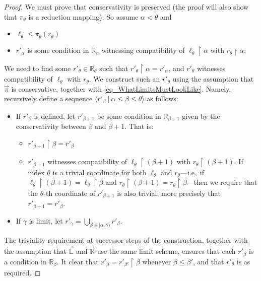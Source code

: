 \documentclass{amsart}
\begin{document}
\begin{proof}
We must prove that conservativity is preserved (the proof will also show that $\pi_\theta$ is a reduction mapping).  So assume $\alpha < \theta$ and
\begin{itemize}
  \item $\ell_\theta \le \pi_\theta(r_\theta)$
  \item $r'_\alpha$ is some condition in $\mathbb{R}_\alpha$ witnessing compatibility of $\ell_\theta \restriction \alpha$ with $r_\theta \restriction \alpha$;  
 \end{itemize}
We need to find some $r'_\theta \in \mathbb{R}_\theta$ such that $r'_\theta \restriction \alpha = r'_\alpha$, and $r'_\theta$ witnesses compatibility of $\ell_\theta$ with $r_\theta$.  We construct such an $r'_\theta$ using the assumption that $\vec{\pi}$ is conservative, together with \eqref{eq_WhatLimitsMustLookLike}.  Namely, recursively define a sequence $\langle r'_\beta \ | \ \alpha \le \beta \le \theta \rangle$ as follows:
\begin{itemize}
 \item If $r'_\beta$ is defined, let $r'_{\beta+1}$ be some condition in $\mathbb{R}_{\beta+1}$ given by the conservativity between $\beta$ and $\beta + 1$.  That is:
 \begin{itemize}
  \item  $r'_{\beta+1} \restriction \beta = r'_\beta$ 
  \item $r'_{\beta+1}$ witnesses compatibility of $\ell_\theta \restriction (\beta+1)$ with $r_\theta \restriction (\beta+1)$.  If index $\theta$ is a trivial coordinate for both $\ell_\theta$ and $r_\theta$---i.e.\ if  $\ell_\theta \restriction (\beta+1) = \ell_\theta \restriction \beta$ and $r_\theta \restriction (\beta+1) = r_\theta \restriction \beta$---then we require that the $\theta$-th coordinate of $r'_{\beta+1}$ is also trivial; more precisely that $r'_{\beta+1} = r'_\beta$.   
 \end{itemize}
 
 \item If $\gamma$ is limit, let $r'_\gamma = \bigcup_{\beta \in [\alpha, \gamma)} r'_\beta$.
\end{itemize}

The triviality requirement at successor steps of the construction, together with the assumption that $\vec{\mathbb{L}}$ and $\vec{\mathbb{R}}$ use the same limit scheme, ensures that each $r'_\beta$ is a condition in $\mathbb{R}_\beta$.  It clear that $r'_\beta = r'_{\beta'} \restriction \beta$ whenever $\beta \le \beta'$, and that $r'_\theta$ is as required. 
\end{proof}
\end{document}
